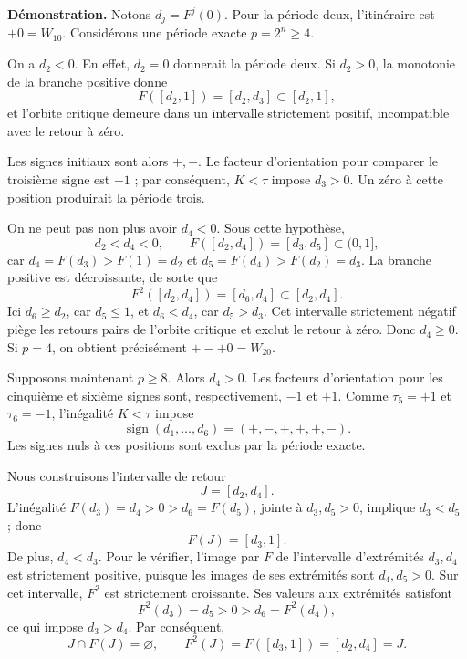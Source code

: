 \textbf{Démonstration.} Notons \(d_j=F^j(0)\). Pour la période deux, l’itinéraire est \(+0=W_10\). Considérons une période exacte \(p=2^n\ge4\).

On a \(d_2<0\). En effet, \(d_2=0\) donnerait la période deux. Si \(d_2>0\), la monotonie de la branche positive donne
\[
F([d_2,1])=[d_2,d_3]\subset[d_2,1],
\]
et l’orbite critique demeure dans un intervalle strictement positif, incompatible avec le retour à zéro.

Les signes initiaux sont alors \(+,-\). Le facteur d’orientation pour comparer le troisième signe est \(-1\) ; par conséquent, \(K<\tau\) impose \(d_3>0\). Un zéro à cette position produirait la période trois.

On ne peut pas non plus avoir \(d_4<0\). Sous cette hypothèse,
\[
d_2<d_4<0,
\qquad F([d_2,d_4])=[d_3,d_5]\subset(0,1],
\]
car \(d_4=F(d_3)>F(1)=d_2\) et \(d_5=F(d_4)>F(d_2)=d_3\). La branche positive est décroissante, de sorte que
\[
F^2([d_2,d_4])=[d_6,d_4]\subset[d_2,d_4].
\]
Ici \(d_6\ge d_2\), car \(d_5\le1\), et \(d_6<d_4\), car \(d_5>d_3\). Cet intervalle strictement négatif piège les retours pairs de l’orbite critique et exclut le retour à zéro. Donc \(d_4\ge0\). Si \(p=4\), on obtient précisément \(+-+0=W_20\).

Supposons maintenant \(p\ge8\). Alors \(d_4>0\). Les facteurs d’orientation pour les cinquième et sixième signes sont, respectivement, \(-1\) et \(+1\). Comme \(\tau_5=+1\) et \(\tau_6=-1\), l’inégalité \(K<\tau\) impose
\begin{equation}
\operatorname{sign}(d_1,\ldots,d_6)=(+,-,+,+,+,-).
\label{hmtfg:clasificacion:eq:1}
\end{equation}
Les signes nuls à ces positions sont exclus par la période exacte.

Nous construisons l’intervalle de retour
\[
J=[d_2,d_4].
\]
L’inégalité \(F(d_3)=d_4>0>d_6=F(d_5)\), jointe à \(d_3,d_5>0\), implique \(d_3<d_5\) ; donc
\[
F(J)=[d_3,1].
\]
De plus, \(d_4<d_3\). Pour le vérifier, l’image par \(F\) de l’intervalle d’extrémités \(d_3,d_4\) est strictement positive, puisque les images de ses extrémités sont \(d_4,d_5>0\). Sur cet intervalle, \(F^2\) est strictement croissante. Ses valeurs aux extrémités satisfont
\[
F^2(d_3)=d_5>0>d_6=F^2(d_4),
\]
ce qui impose \(d_3>d_4\). Par conséquent,
\begin{equation}
J\cap F(J)=\varnothing,
\qquad F^2(J)=F([d_3,1])=[d_2,d_4]=J.
\label{hmtfg:clasificacion:eq:2}
\end{equation}

